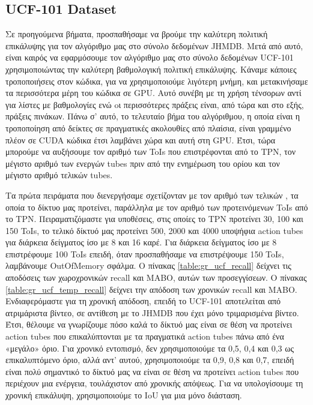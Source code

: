 \subsection {\en UCF-101 Dataset\gr}
Σε προηγούμενα βήματα, προσπαθήσαμε να βρούμε την καλύτερη πολιτική επικάλυψης για τον αλγόριθμο μας στο σύνολο δεδομένων \en  JHMDB\gr.
Μετά από αυτό, είναι καιρός να εφαρμόσουμε τον αλγόριθμο μας στο σύνολο δεδομένων \en UCF-101 \gr χρησιμοποιώντας την καλύτερη βαθμολογική
πολιτική επικάλυψης. Κάναμε κάποιες τροποποιήσεις στον κώδικα, για να χρησιμοποιούμε λιγότερη μνήμη, και μετακινήσαμε τα περισσότερα μέρη του κώδικα σε \en GPU\gr. Αυτό συνέβη με τη χρήση τένσορων αντί για  λίστες με βαθμολογίες ενώ oι περισσότερες πράξεις είναι, από τώρα και στο εξής,
πράξεις πινάκων. Πάνω σ' αυτό, το τελευταίο βήμα του αλγόριθμου, η οποία είναι η τροποποίηση από δείκτες σε πραγματικές ακολουθίες από
πλαίσια, είναι γραμμένο πλέον σε \en CUDA \gr κώδικα έτσι λαμβάνει χώρα και αυτή στη \en GPU\gr. Έτσι, τώρα μπορούμε να αυξήσουμε τον αριθμό των \en ToIs \gr που επιστρέφονται από το \en TPN\gr, τον μέγιστο αριθμό των ενεργών \en tubes \gr πριν από την ενημέρωση του ορίου και τον μέγιστο αριθμό τελικών
\en tubes\gr.  \par
Τα πρώτα πειράματα που διενεργήσαμε σχετίζονταν με τον αριθμό των τελικών , τα οποία το δίκτυο μας προτείνει, παράλληλα με τον αριθμό
των προτεινόμενων \en ToIs \gr  από  το \en TPN\gr. Πειραματιζόμαστε για υποθέσεις, στις οποίες το \en TPN \gr προτείνει 30, 100 και 150 \en ToIs\gr, το τελικό δίκτυό μας προτείνει 500, 2000 και 4000 υποψήφια \en action tubes \gr για
διάρκεια δείγματος ίσο με 8 και 16 καρέ. Για διάρκεια δείγματος ίσο με 8 επιστρέφουμε 100 \en ToIs \gr επειδή, όταν
προσπαθήσαμε να επιστρέψουμε 150 \en ToIs\gr, λαμβάνουμε \en OutOfMemory \gr σφάλμα.
O πίνακας \ref{table:gr_ucf_recall} δείχνει τις αποδόσεις των χωροχρονικών \en recall \gr και \en MABO\gr,  αυτών των προσεγγίσεων.
O πίνακας \ref{table:gr_ucf_temp_recall} δείχνει την απόδοση των χρονικών \en recall \gr και \en MABO\gr.
Ενδιαφερόμαστε για τη χρονική απόδοση, επειδή το \en UCF-101  \gr αποτελείται από ατριμάριστα βίντεο, σε αντίθεση με το \en JHMDB \gr
που έχει μόνο τριμαρισμένα βίντεο. Έτσι, θέλουμε να γνωρίζουμε πόσο καλά το δίκτυό μας είναι σε θέση να προτείνει \en action tubes \gr που
επικαλύπτονται με τα πραγματικά \en action tubes \gr πάνω από ένα «μεγάλο» όριο.
Για χρονικό εντοπισμό, δεν χρησιμοποιούμε τα 0,5, 0,4 και 0,3 ως επικαλυπτόμενο όριο, αλλά αντ' αυτού, χρησιμοποιούμε τα 0,9, 0,8 και 0,7,
επειδή είναι πολύ σημαντικό το δίκτυό μας να είναι σε θέση να προτείνει \en action tubes \gr που
περιέχουν μια ενέργεια, τουλάχιστον από χρονικής απόψεως.
Για να υπολογίσουμε τη χρονική επικάλυψη, χρησιμοποιούμε το \en IoU \gr για μια μόνο διάσταση.

